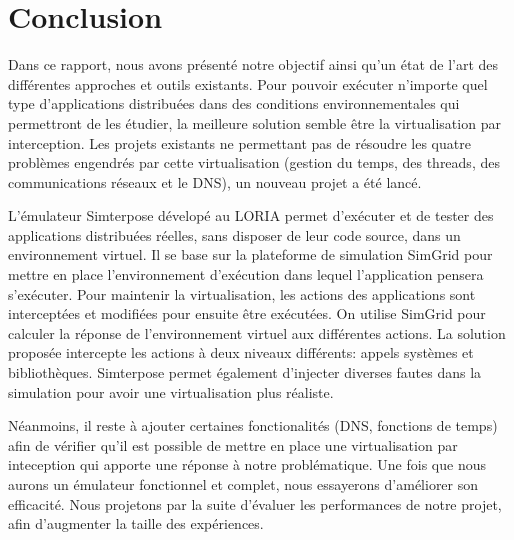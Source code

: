\section{Conclusion}
\label{section:ccl}

Dans ce rapport, nous avons présenté notre objectif ainsi qu'un état de l'art
des différentes approches et outils existants. Pour pouvoir exécuter n'importe
quel type d'applications distribuées dans des conditions environnementales qui
permettront de les étudier, la meilleure solution semble être la virtualisation
par interception. Les projets existants ne permettant pas de résoudre les quatre
problèmes engendrés par cette virtualisation (gestion du temps, des threads, des
communications réseaux et le DNS), un nouveau projet a été lancé.

L'émulateur Simterpose dévelopé au LORIA permet d'exécuter et de tester des
applications distribuées réelles, sans disposer de leur code source, dans un
environnement virtuel. Il se base sur la plateforme de simulation SimGrid pour
mettre en place l'environnement d'exécution dans lequel l'application pensera
s'exécuter. Pour maintenir la virtualisation, les actions des applications sont
interceptées et modifiées pour ensuite être exécutées. On utilise SimGrid pour
calculer la réponse de l'environnement virtuel aux différentes actions. La
solution proposée intercepte les actions à deux niveaux différents: appels
systèmes et bibliothèques. Simterpose permet également d'injecter diverses
fautes dans la simulation pour avoir une virtualisation plus réaliste.

Néanmoins, il reste à ajouter certaines fonctionalités (DNS, fonctions de temps)
afin de vérifier qu'il est possible de mettre en place une virtualisation par
inteception qui apporte une réponse à notre problématique. Une fois que nous
aurons un émulateur fonctionnel et complet, nous essayerons d'améliorer son
efficacité. Nous projetons par la suite d'évaluer les performances de notre
projet, afin d'augmenter la taille des expériences.

